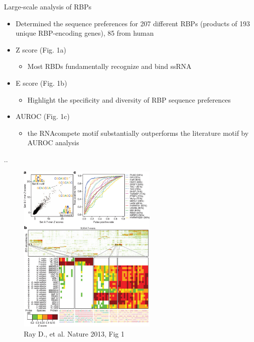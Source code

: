 \documentclass[professionalfont, 12pt, default]{beamer}
\providecommand{\tightlist}{%
    \setlength{\itemsep}{0pt}\setlength{\parskip}{0pt}}
\begin{document}
\begin{frame}{Large-scale analysis of RBPs}

\begin{itemize}
\tightlist
\item
  Determined the sequence preferences for 207 different RBPs (products
  of 193 unique RBP-encoding genes), 85 from human
\item
  Z score (Fig. 1a)

  \begin{itemize}
  \tightlist
  \item
    Most RBDs fundamentally recognize and bind ssRNA
  \end{itemize}
\item
  E score (Fig. 1b)

  \begin{itemize}
  \tightlist
  \item
    Highlight the specificity and diversity of RBP sequence preferences
  \end{itemize}
\item
  AUROC (Fig. 1c)

  \begin{itemize}
  \tightlist
  \item
    the RNAcompete motif substantially outperforms the literature motif
    by AUROC analysis
  \end{itemize}
\end{itemize}

\end{frame}

\begin{frame}{..}

\begin{figure}
\centering
\includegraphics[width=0.60000\textwidth]{img/f1.jpg}
\caption{Ray D., et al. Nature 2013, Fig 1}
\end{figure}

\end{frame}
\end{document}
